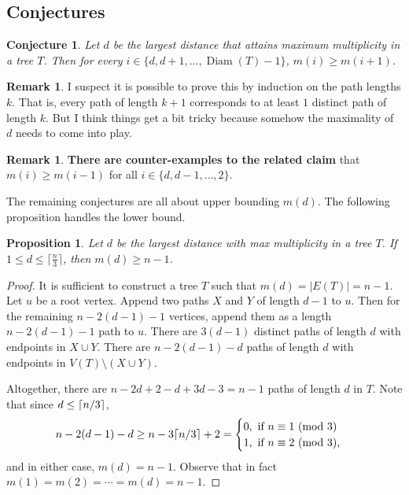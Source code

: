 \documentclass[12]{article}
\newcommand{\Mod}[1]{\ (\mathrm{mod}\ #1)}
\DeclarePairedDelimiter\ceil{\lceil}{\rceil}
\DeclareMathOperator{\diam}{Diam}
\newtheorem{prop}[thm]{Proposition}
\newtheorem{conj}[thm]{Conjecture}
\theoremstyle{definition}
\newtheorem{rem}[thm]{Remark}
\begin{document}
	\subsection{Conjectures}
	
	\begin{conj}
		Let $d$ be the largest distance that attains maximum multiplicity in a tree $T$.  Then for every $i \in \{d, d+1, \ldots, \diam(T)-1\}$, $m(i) \geq m(i+1)$.
	\end{conj}

	\begin{rem}
		I suspect it is possible to prove this by induction on the path lengths $k$.  That is, every path of length $k+1$ corresponds to at least $1$ distinct path of length $k$.  But I think things get a bit tricky because somehow the maximality of $d$ needs to come into play.
	\end{rem}

	\begin{rem}
		\textbf{There are counter-examples to the related claim} that $m(i) \geq m(i-1)$ for all $i \in \{d,d-1,\ldots,2\}$.
	\end{rem}

	The remaining conjectures are all about upper bounding $m(d)$.  The following proposition handles the lower bound.
	
	\begin{prop}\label{Proposition-Minimizing-m(d)-to(n-1)}
		Let $d$ be the largest distance with max multiplicity in a tree $T$.  If $1 \leq d \leq \lceil \frac{n}{3} \rceil$, then $m(d) \geq n-1$.
	\end{prop}

	\begin{proof}
		It is sufficient to construct a tree $T$ such that $m(d) = |E(T)| = n-1$.  Let $u$ be a root vertex.  Append two paths $X$ and $Y$ of length $d-1$ to $u$. Then for the remaining $n-2(d-1)-1$ vertices, append them as a length $n-2(d-1)-1$ path to $u$.  There are $3(d-1)$ distinct paths of length $d$ with endpoints in $X \cup Y$.  There are $n-2(d-1)-d$ paths of length $d$ with endpoints in $V(T) \setminus (X \cup Y)$. 
		
		Altogether, there are $n-2d+2-d + 3d-3 = n-1$ paths of length $d$ in $T$.  Note that since $d \leq \ceil{n/3}$, 
		$$n-2(d-1)-d \geq n-3\ceil{n/3}+2 = \begin{cases}
			0, \text{ if } n \equiv 1 \Mod{3}	\\
			1, \text{ if } n \equiv 2 \Mod{3},
		\end{cases}$$ and in either case, $m(d) = n-1$.  Observe that in fact $m(1) = m(2) = \cdots = m(d) = n-1$. \qedhere
	\end{proof}
	
\end{document}
